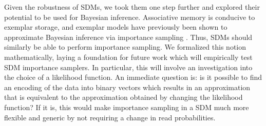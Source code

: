 \documentclass[10pt,letterpaper]{article}
\begin{document}
Given the robustness of SDMs, we took them one step further and
explored their potential to be used for Bayesian
inference. Associative memory is conducive to exemplar storage, and
exemplar models have previously been shown to approximate Bayesian
inference via importance sampling \cite{Shi2010}. Thus, SDMs should
similarly be able to perform importance sampling. We formalized this
notion mathematically, laying a foundation for future work which will
empirically test SDM importance samplers. In particular, this will
involve an investigation into the choice of a likelihood function. An
immediate question is: is it possible to find an encoding of the data
into binary vectors which results in an approximation that is
equivalent to the approximation obtained by changing the likelihood
function? If it is, this would make importance sampling in a SDM much
more flexible and generic by not requiring a change in read
probabilities.





\setlength{\bibleftmargin}{.125in}
\setlength{\bibindent}{-\bibleftmargin}





\end{document}
